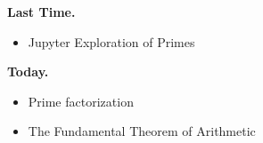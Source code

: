 \documentclass[t]{beamer}
\subtitle{Fundamental Theorem of Arithmetic}
\begin{document}
	
\startdoc
\begin{frame}[c]{\insertframenumber}
	\begin{block}{\textbf{Last Time.}}
	\begin{itemize}[label=--]
		\item Jupyter Exploration of Primes
	\end{itemize}
	\end{block}
	\begin{block}{\textbf{Today.}}
		\begin{itemize}[label=--]
			\item Prime factorization
			\item The Fundamental Theorem of Arithmetic
		\end{itemize}
	\end{block}
\end{frame}
\end{document}
